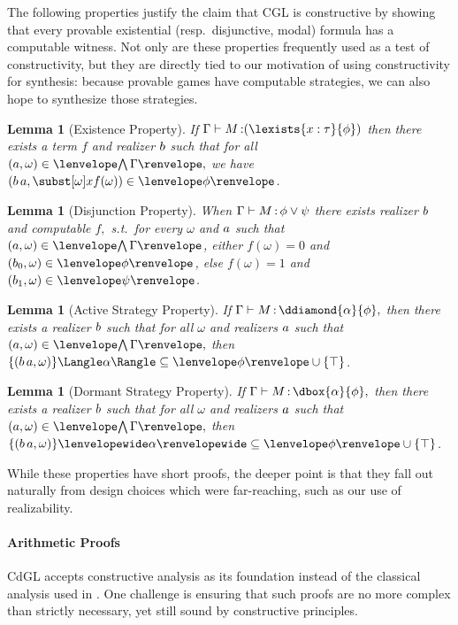 \documentclass[12pt]{cmuthesis}
\newtheorem{lemma}[theorem]{Lemma}
\theoremstyle{definition}
\theoremstyle{remark}
\newcommand{\om}{\omega}
\newcommand{\CGL}{\textsf{CGL}\xspace}
\newcommand{\CdGL}{\textsf{CdGL}\xspace}
\newcommand{\G}{\Gamma}
\begin{document}
The following properties justify the claim that \CGL is constructive by showing that every provable existential (resp.\ disjunctive, modal) formula has a computable witness.
Not only are these properties frequently used as a test of constructivity, but they are directly tied to our motivation of using constructivity for synthesis: because provable games have computable strategies, we can also hope to synthesize those strategies.
\begin{lemma}[Existence Property]
If $\proves{\Gamma}{M}{(\lexists{x:\tau}{\phi})}$ then there exists a term $f$ and realizer $\ab$ such that for all $(\aa,\om) \in \cintR{\G},$
we have $(\rzApp{\ab}{\aa},\ssub{\om}{x}{f(\om)}) \in \fintR{\phi}$.
\label{lem:term-ep}
\end{lemma}
\begin{lemma}[Disjunction Property]
When $\proves{\Gamma}{M}{\phi \lor \psi}$ there exists realizer $\ab$ and computable $f,$ s.t.\ for every $\om$ and $\aa$ such that $(\aa,\omega) \in \cintR{\G}$, either $f(\omega)=0$ and $(\rzFst{\ab},\omega) \in \fintR{\phi}{}$, else $f(\omega)=1$ and $(\rzSnd{\ab},\omega) \in \fintR{\psi}$.
\end{lemma}
\begin{lemma}[Active Strategy Property]
If $\proves{\Gamma}{M}{\ddiamond{\alpha}{\phi}},$ then there exists a realizer $\ab$ such that for all $\om$ and realizers $\aa$ such that $(\aa,\om) \in \cintR{\G},$ 
then $\strategyforR[\alpha]{\{(\rzApp{\ab}{\aa},\om)\}} \subseteq \fintR{\phi} \cup \{\stt\}$.
\end{lemma}
\begin{lemma}[Dormant Strategy Property]
If $\proves{\Gamma}{M}{\dbox{\alpha}{\phi}},$ then there exists a realizer $\ab$ such that for all $\om$ and realizers $\aa$ such that $(\aa,\om) \in \cintR{\G},$ 
then $\dstrategyforR[\alpha]{\{(\rzApp{\ab}{\aa},\om)\}} \subseteq \fintR{\phi} \cup \{\stt\}$.
\end{lemma}
While these properties have short proofs, the deeper point is that they fall out naturally from design choices which were far-reaching, such as our use of realizability.

\paragraph*{Arithmetic Proofs}
\label{sec:arith-proof}
\CdGL accepts constructive analysis as its foundation instead of the classical analysis used in \dGL.
One challenge is ensuring that such proofs are no more complex than strictly necessary, yet still sound by constructive principles.
\end{document}
